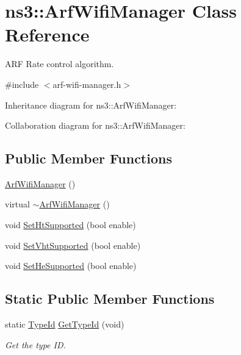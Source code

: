\hypertarget{classns3_1_1ArfWifiManager}{}\section{ns3\+:\+:Arf\+Wifi\+Manager Class Reference}
\label{classns3_1_1ArfWifiManager}


A\+RF Rate control algorithm.  




{\ttfamily \#include $<$arf-\/wifi-\/manager.\+h$>$}



Inheritance diagram for ns3\+:\+:Arf\+Wifi\+Manager\+:


Collaboration diagram for ns3\+:\+:Arf\+Wifi\+Manager\+:
\subsection*{Public Member Functions}
\begin{DoxyCompactItemize}
\item 
\hyperlink{classns3_1_1ArfWifiManager_a458122abd9d00849a123388c4efd01e8}{Arf\+Wifi\+Manager} ()
\item 
virtual \hyperlink{classns3_1_1ArfWifiManager_a1531c7eed2ae5256a4cf5e61447d1793}{$\sim$\+Arf\+Wifi\+Manager} ()
\item 
void \hyperlink{classns3_1_1ArfWifiManager_affd37add36546cb5753f6827f6076a0b}{Set\+Ht\+Supported} (bool enable)
\item 
void \hyperlink{classns3_1_1ArfWifiManager_af558a355c9aa4cc40f8af2a40c988e5a}{Set\+Vht\+Supported} (bool enable)
\item 
void \hyperlink{classns3_1_1ArfWifiManager_acf283be98519f4567b499f9267ead1ec}{Set\+He\+Supported} (bool enable)
\end{DoxyCompactItemize}
\subsection*{Static Public Member Functions}
\begin{DoxyCompactItemize}
\item 
static \hyperlink{classns3_1_1TypeId}{Type\+Id} \hyperlink{classns3_1_1ArfWifiManager_adbcf7bc5c13c68f456a8f59d46872050}{Get\+Type\+Id} (void)
\begin{DoxyCompactList}\small\item\em Get the type ID. \end{DoxyCompactList}\end{DoxyCompactItemize}
